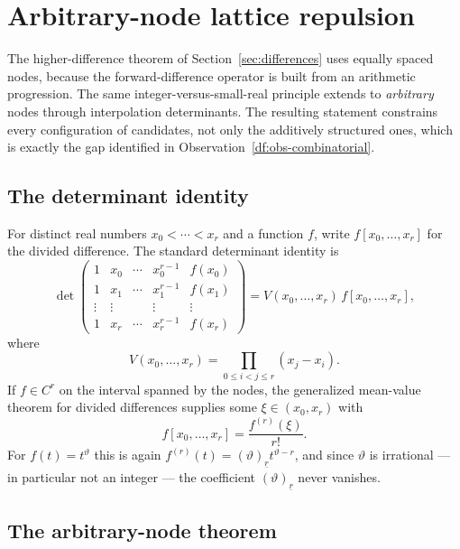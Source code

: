 \documentclass[11pt,oneside]{article}
\theoremstyle{definition}
\theoremstyle{remark}
\newcommand{\thetaq}{\vartheta}
\newcommand{\fall}[2]{\left(#1\right)_{\!\underline{#2}}}
\begin{document}
\section{Arbitrary-node lattice repulsion}
\label{sec:arbnode}

The higher-difference theorem of Section~\ref{sec:differences} uses equally spaced nodes,
because the forward-difference operator is built from an arithmetic progression.  The same
integer-versus-small-real principle extends to \emph{arbitrary} nodes through interpolation
determinants.  The resulting statement constrains every configuration of candidates, not only
the additively structured ones, which is exactly the gap identified in
Observation~\ref{df:obs-combinatorial}.

\subsection{The determinant identity}

For distinct real numbers $x_0<\cdots<x_r$ and a function $f$, write $f[x_0,\ldots,x_r]$ for
the divided difference.  The standard determinant identity is
\begin{equation}
 \det
 \begin{pmatrix}
  1&x_0&\cdots&x_0^{r-1}&f(x_0)\\
  1&x_1&\cdots&x_1^{r-1}&f(x_1)\\
  \vdots&\vdots&&\vdots&\vdots\\
  1&x_r&\cdots&x_r^{r-1}&f(x_r)
 \end{pmatrix}
 =V(x_0,\ldots,x_r)\,f[x_0,\ldots,x_r],
\label{df:det-divdiff}
\end{equation}
where
\[
 V(x_0,\ldots,x_r)=\prod_{0\le i<j\le r}(x_j-x_i).
\]
If $f\in C^{r}$ on the interval spanned by the nodes, the generalized mean-value theorem for
divided differences supplies some $\xi\in(x_0,x_r)$ with
\begin{equation}
 f[x_0,\ldots,x_r]=\frac{f^{(r)}(\xi)}{r!}.
\label{df:divdiff-mvt}
\end{equation}
For $f(t)=t^{\thetaq}$ this is again $f^{(r)}(t)=\fall{\thetaq}{r}t^{\thetaq-r}$, and since
$\thetaq$ is irrational --- in particular not an integer --- the coefficient
$\fall{\thetaq}{r}$ never vanishes.

\subsection{The arbitrary-node theorem}
\end{document}
